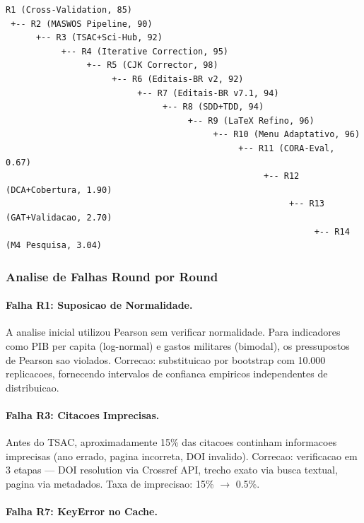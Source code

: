 \begin{verbatim}
R1 (Cross-Validation, 85)
 +-- R2 (MASWOS Pipeline, 90)
      +-- R3 (TSAC+Sci-Hub, 92)
           +-- R4 (Iterative Correction, 95)
                +-- R5 (CJK Corrector, 98)
                     +-- R6 (Editais-BR v2, 92)
                          +-- R7 (Editais-BR v7.1, 94)
                               +-- R8 (SDD+TDD, 94)
                                    +-- R9 (LaTeX Refino, 96)
                                         +-- R10 (Menu Adaptativo, 96)
                                              +-- R11 (CORA-Eval, 0.67)
                                                   +-- R12 (DCA+Cobertura, 1.90)
                                                        +-- R13 (GAT+Validacao, 2.70)
                                                             +-- R14 (M4 Pesquisa, 3.04)
\end{verbatim}

\subsubsection{Analise de Falhas Round por Round}

\paragraph{Falha R1: Suposicao de Normalidade.}

A analise inicial utilizou Pearson sem verificar normalidade. Para
indicadores como PIB per capita (log-normal) e gastos militares
(bimodal), os pressupostos de Pearson sao violados. Correcao:
substituicao por bootstrap com 10.000 replicacoes, fornecendo
intervalos de confianca empiricos independentes de distribuicao.

\paragraph{Falha R3: Citacoes Imprecisas.}

Antes do TSAC, aproximadamente 15\% das citacoes continham informacoes
imprecisas (ano errado, pagina incorreta, DOI invalido). Correcao:
verificacao em 3 etapas --- DOI resolution via Crossref API, trecho
exato via busca textual, pagina via metadados. Taxa de imprecisao:
15\% $\to$ 0.5\%.

\paragraph{Falha R7: KeyError no Cache.}

